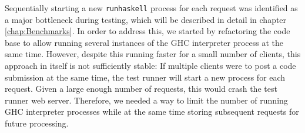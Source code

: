 Sequentially starting a new \texttt{runhaskell} process for each request was identified as a major bottleneck during testing, which will be described in detail in chapter \ref{chap:Benchmarks}.
In order to address this, we started by refactoring the code base to allow running several instances of the GHC interpreter process at the same time.
However, despite this running faster for a small number of clients, this approach in itself is not sufficiently stable:
If multiple clients were to post a code submission at the same time, the test runner will start a new process for each request.
Given a large enough number of requests, this would crash the test runner web server.
Therefore, we needed a way to limit the number of running GHC interpreter processes while at the same time storing subsequent requests for future processing.
